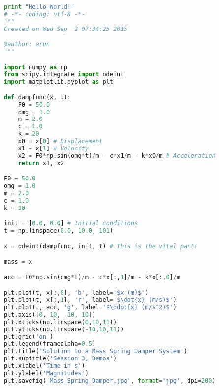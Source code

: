 \documentclass[10pt,a4paper]{article}
\begin{document}
\begin{lstlisting}[language=Python, frame=single]
print "Hello World!"
# -*- coding: utf-8 -*-
"""
Created on Wed Sep  2 07:34:25 2015

@author: arun
"""

import numpy as np
from scipy.integrate import odeint
import matplotlib.pyplot as plt

def dampfunc(x, t):
    F0 = 50.0
    omg = 1.0
    m = 2.0
    c = 1.0
    k = 20
    x0 = x[0] # Displacement
    x1 = x[1] # Velocity
    x2 = F0*np.sin(omg*t)/m - c*x1/m - k*x0/m # Acceleration
    return x1, x2

F0 = 50.0
omg = 1.0
m = 2.0
c = 1.0
k = 20

init = [0.0, 0.0] # Initial conditions
t = np.linspace(0.0, 10.0, 101)

x = odeint(dampfunc, init, t) # This is the vital part!

mass = x

acc = F0*np.sin(omg*t)/m - c*x[:,1]/m - k*x[:,0]/m

plt.plot(t, x[:,0], 'b', label='$x (m)$')
plt.plot(t, x[:,1], 'r', label='$\dot{x} (m/s)$')
plt.plot(t, acc, 'g', label='$\ddot{x} (m/s^2)$')
plt.axis([0, 10, -10, 10])
plt.xticks(np.linspace(0,10,11))
plt.yticks(np.linspace(-10,10,11))
plt.grid('on')
plt.legend(framealpha=0.5)
plt.title('Solution to a Mass Spring Damper System')
plt.suptitle('Session 3, Demos')
plt.xlabel('Time in s')
plt.ylabel('Magnitudes')
plt.savefig('Mass_Spring_Damper.jpg', format='jpg', dpi=200)
\end{lstlisting}


\end{document}
